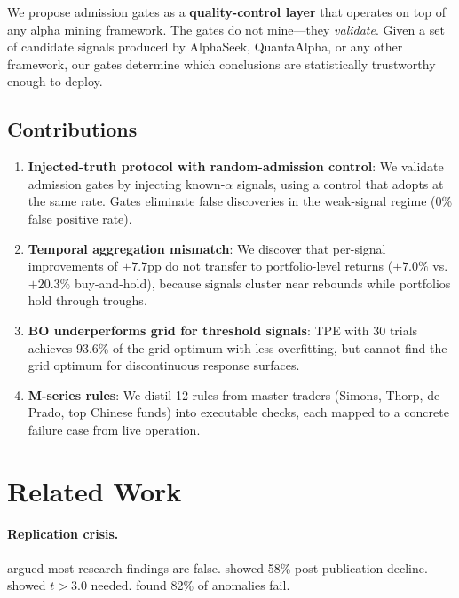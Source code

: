 \documentclass[11pt]{article}
\begin{document}
We propose admission gates as a \textbf{quality-control layer} that operates
on top of any alpha mining framework. The gates do not mine---they
\emph{validate}. Given a set of candidate signals produced by AlphaSeek,
QuantaAlpha, or any other framework, our gates determine which conclusions
are statistically trustworthy enough to deploy.

\subsection{Contributions}
\begin{enumerate}
\item \textbf{Injected-truth protocol with random-admission control}: We
  validate admission gates by injecting known-$\alpha$ signals, using a
  control that adopts at the same rate. Gates eliminate false discoveries in
  the weak-signal regime (0\% false positive rate).
\item \textbf{Temporal aggregation mismatch}: We discover that per-signal
  improvements of $+7.7$pp do not transfer to portfolio-level returns
  ($+7.0\%$ vs.\ $+20.3\%$ buy-and-hold), because signals cluster near
  rebounds while portfolios hold through troughs.
\item \textbf{BO underperforms grid for threshold signals}: TPE with 30
  trials achieves 93.6\% of the grid optimum with less overfitting, but
  cannot find the grid optimum for discontinuous response surfaces.
\item \textbf{M-series rules}: We distil 12 rules from master traders
  (Simons, Thorp, de Prado, top Chinese funds) into executable checks, each
  mapped to a concrete failure case from live operation.
\end{enumerate}


\section{Related Work}
\label{sec:related}

\paragraph{Replication crisis.}
\citet{ioannidis} argued most research findings are false.
\citet{mcleanpontiff} showed 58\% post-publication decline.
\citet{harveyliuzhu} showed $t > 3.0$ needed. \citet{houxuezhang} found 82\%
of anomalies fail.
\end{document}
